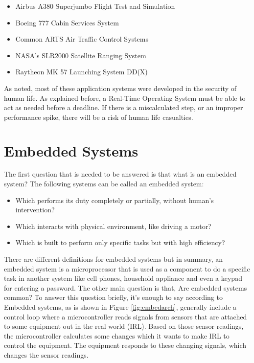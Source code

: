 \documentclass[12pt]{article}
\begin{document}
\begin{itemize}
	\item Airbus A380 Superjumbo Flight Test and Simulation
	\item Boeing 777 Cabin Services System
	\item Common ARTS Air Traffic Control Systems
	\item NASA’s SLR2000 Satellite Ranging System
	\item Raytheon MK 57 Launching System DD(X)
\end{itemize}

As noted, most of these application systems were developed in the security of human life. As
explained before, a Real-Time Operating System must be able to act as needed before a deadline.
If there is a miscalculated step, or an improper performance spike, there will be a risk of human
life casualties.

\cleardoublepage

\section{Embedded Systems}\label{sec:embedded}

The first question that is needed to be answered is that what is an embedded system? The following systems can be called an embedded system:

\begin{itemize}

	\item Which performs its duty completely or partially, without human’s intervention?	
	\item Which interacts with physical environment, like driving a motor?
	\item Which is built to perform only specific tasks but with high efficiency?
	
\end{itemize}

There are different definitions for embedded systems but in summary, an embedded system is a microprocessor that is used as a component to do
a specific task in another system like cell phones, household appliance and even a keypad for entering a password.
The other main question is that, Are embedded systems common? To answer this question briefly, it’s enough to say according to \cite{ref:embed}\\

Embedded systems, as is shown in Figure \ref{fig:embedarch}, generally include a control loop where a microcontroller reads signals from sensors that are attached
to some equipment out in the real world (IRL). Based on those sensor readings, the microcontroller calculates some changes which it wants to
make IRL to control the equipment. The equipment responds to these changing signals, which changes the sensor readings.
\end{document}
